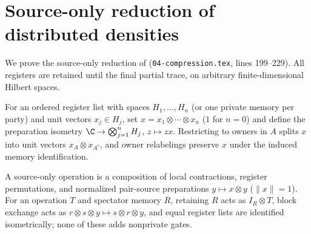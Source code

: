 \section{Source-only reduction of distributed densities}
\label{sec:peps_source_only_reduction}

We prove the source-only reduction of \cite[proof of Theorem~5.2]{OpenAI2026PolynomialPEPS} (\texttt{04-compression.tex}, lines 199--229).
All registers are retained until the final partial trace, on arbitrary finite-dimensional Hilbert spaces.

\begin{definition}
    \label{def:peps_private_product_input}
    \leanok
    For an ordered register list with spaces $H_1,\ldots,H_n$ (or one private memory per party) and unit vectors $x_j\in H_j$, set $x=x_1\otimes\cdots\otimes x_n$ ($1$ for $n=0$) and define the preparation isometry $\C\to\bigotimes_{j=1}^n H_j$, $z\mapsto zx$. Restricting to owners in $A$ splits $x$ into unit vectors $x_A\otimes x_{A^c}$, and owner relabelings preserve $x$ under the induced memory identification.
\end{definition}

\begin{definition}
    \label{def:peps_source_replacement_operations}
    \leanok
    A source-only operation is a composition of local contractions, register permutations, and normalized pair-source preparations $y\mapsto x\otimes y$ ($\|x\|=1$). For an operation $T$ and spectator memory $R$, retaining $R$ acts as $I_R\otimes T$, block exchange acts as $r\otimes s\otimes y\mapsto s\otimes r\otimes y$, and equal register lists are identified isometrically; none of these adds nonprivate gates.
\end{definition}

